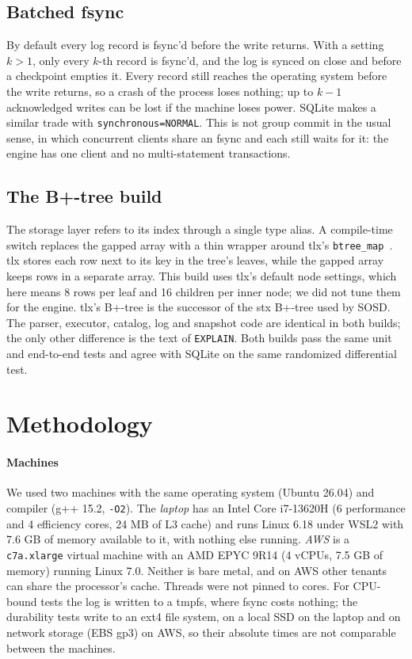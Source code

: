 \documentclass[conference]{IEEEtran}
\begin{document}
\subsection{Batched fsync}

By default every log record is fsync'd before the write returns. With a
setting $k > 1$, only every $k$-th record is fsync'd, and the log is synced
on close and before a checkpoint empties it. Every record still reaches the
operating system before the write returns, so a crash of the process loses
nothing; up to $k-1$ acknowledged writes can be lost if the machine loses
power. SQLite makes a similar trade with \texttt{synchronous=NORMAL}. This
is not group commit in the usual sense, in which concurrent clients share
an fsync and each still waits for it: the engine has one client and no
multi-statement transactions.

\subsection{The B+-tree build}
\label{sec:btree}

The storage layer refers to its index through a single type alias. A
compile-time switch replaces the gapped array with a thin wrapper around
tlx's \texttt{btree\_map}~\cite{tlx}. tlx stores each row next to its key in
the tree's leaves, while the gapped array keeps rows in a separate array. This
build uses tlx's default node settings, which here means 8 rows per leaf and 16
children per inner node; we did not tune them for the engine. tlx's
B+-tree is the successor of the stx B+-tree used by SOSD. The parser,
executor, catalog, log and snapshot code are identical in both builds; the
only other difference is the text of \texttt{EXPLAIN}. Both builds pass the
same unit and end-to-end tests and agree with SQLite on the same randomized
differential test.

\section{Methodology}
\label{sec:method}

\paragraph{Machines} We used two machines with the same operating system
(Ubuntu 26.04) and compiler (g++ 15.2, \texttt{-O2}). The \emph{laptop} has an
Intel Core i7-13620H (6 performance and 4 efficiency cores, 24 MB of L3 cache)
and runs Linux 6.18 under WSL2 with 7.6 GB of memory available to it, with
nothing else running. \emph{AWS} is a \texttt{c7a.xlarge} virtual machine with
an AMD EPYC 9R14 (4 vCPUs, 7.5 GB of memory) running Linux 7.0. Neither is bare
metal, and on AWS other tenants can share the processor's cache. Threads were
not pinned to cores. For CPU-bound tests the log is written to a tmpfs, where
fsync costs nothing; the durability tests write to an ext4 file system, on a
local SSD on the laptop and on network storage (EBS gp3) on AWS, so their
absolute times are not comparable between the machines.
\end{document}
